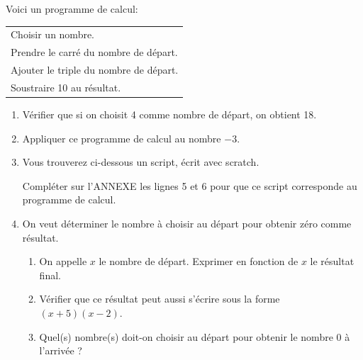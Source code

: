\documentclass[exercice,a4]{thedocument}%
\begin{document}
%

\medskip

\parbox{0.45\linewidth}{Voici un programme de calcul:}
\hfill
\parbox{0.45\linewidth}{\begin{tabular}{|l|}\hline
Choisir un nombre.\\
Prendre le carré du nombre de départ.\\
Ajouter le triple du nombre de départ.\\
Soustraire 10 au résultat.\\ \hline
\end{tabular}}

\medskip

\begin{enumerate}
\item Vérifier que si on choisit 4 comme nombre de départ, on obtient 18.
\item Appliquer ce programme de calcul au nombre $- 3$.
\item Vous trouverez ci-dessous un script, écrit avec scratch.

\begin{scratch}
\end{scratch}

\medskip

Compléter sur l'ANNEXE  les lignes 5 et 6 pour que ce script corresponde au programme de calcul.

\item On veut déterminer le nombre à choisir au départ pour obtenir zéro comme résultat.
	\begin{enumerate}
		\item On appelle $x$ le nombre de départ. Exprimer en fonction de $x$ le résultat final.
		\item Vérifier que ce résultat peut aussi s'écrire sous la forme $(x + 5)(x - 2)$.
		\item Quel(s) nombre(s) doit-on choisir au départ pour obtenir le nombre $0$ à l'arrivée ?
	\end{enumerate}
\end{enumerate}
\end{document}
